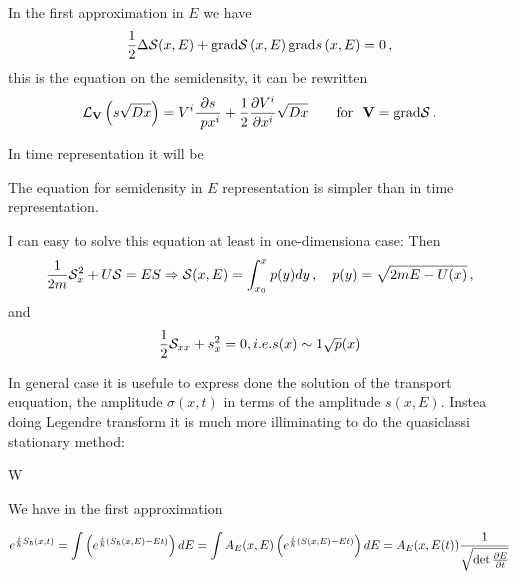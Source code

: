 In the first approximation  in  $E$ we have
     $$
     {1\over 2}\Delta \S(x,E)+
          {\rm grad} \S \left(x,E\right)
          {\rm grad}  s\left(x,E\right)
        =0\,,
       $$
this is the equation on the semidensity, it can be rewritten
     $$
{\cal L}_{\bf V}\left( s\sqrt {Dx}\right)=
      V^i{\p s\over \ p x^i}+{1\over 2}{\p V^i\over \p x^i}
          \sqrt {Dx}\qquad
   \hbox {for }\,\, {\bf V}={\rm grad} \S\,.
      $$

In time representation it will be



The equation for semidensity in $E$ representation is simpler
than in time representation.


I can easy to solve this equation at least in one-dimensiona case:
      Then
     $$
{1\over 2m}\S_x^2+U\S=ES\Rightarrow
\S(x,E)=\int_{x_0}^x p(y)dy\,,\quad p(y)=\sqrt{2mE-U(x)}\,,
    $$     
and
 $$
{1\over 2}\S_{xx}+s_x^2=0, i.e.  s(x)\sim {1\sqrt p(x)}
      $$

In general case it is usefule to express done the solution
of the transport euquation, the amplitude
  $\sigma(x,t)$  in terms of the amplitude $s(x,E)$.
Instea doing Legendre transform it is much more
illiminating to do the quasiclassi stationary method:

W

  We have in the first approximation

       $$
e^{{i\over \h}  S_\h(x,t)}=
  \int 
\left(
e^{{i\over \h}  
 \left(S_\h(x,E)-Et\right)}
\right)dE=
  \int
    A_E(x,E) 
\left(
e^{{i\over \h}  
 \left(S(x,E)-Et\right)}
\right)dE=
A_E(x,E(t)){1\over\sqrt {\det {\p E\over \p t}}}
       $$
 
\bye
